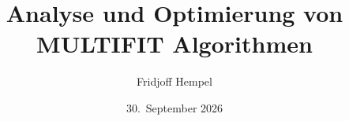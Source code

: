 \documentclass[ngerman]{scrreprt}
\title{Analyse und Optimierung von MULTIFIT Algorithmen}
\author{Fridjoff Hempel}
\date{30.~September 2026}
\theoremstyle{definition}
\theoremstyle{remark}
\theoremstyle{myremark}
\begin{document}
\maketitle

\tableofcontents
\listoftodos








\printbibliography


\end{document}
